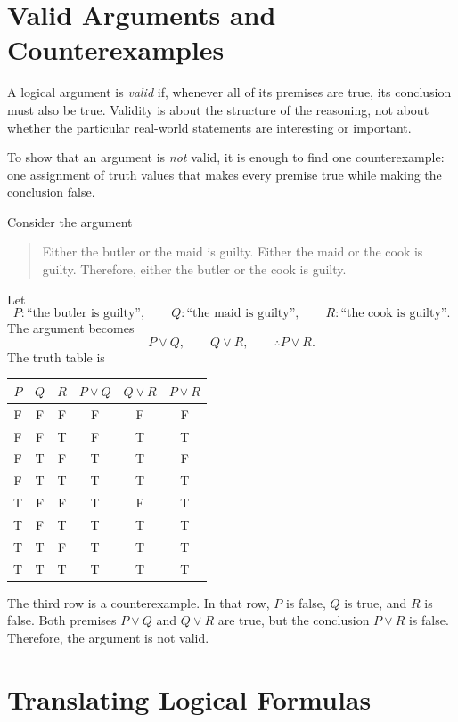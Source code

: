 \section{Valid Arguments and Counterexamples}
\label{mf:logic-argument-validity}
\label{mf:logic-counterexamples}

A logical argument is \emph{valid} if, whenever all of its premises are true, its conclusion must also be true. Validity is about the structure of the reasoning, not about whether the particular real-world statements are interesting or important.

To show that an argument is \emph{not} valid, it is enough to find one counterexample: one assignment of truth values that makes every premise true while making the conclusion false.

Consider the argument
\begin{quote}
Either the butler or the maid is guilty. Either the maid or the cook is guilty. Therefore, either the butler or the cook is guilty.
\end{quote}
Let
\[
P: \text{``the butler is guilty''},
\qquad
Q: \text{``the maid is guilty''},
\qquad
R: \text{``the cook is guilty''}.
\]
The argument becomes
\[
P \lor Q,
\qquad
Q \lor R,
\qquad
\therefore P \lor R.
\]
The truth table is
\begin{center}
\begin{tabular}{c c c c c c}
\hline
\(P\) & \(Q\) & \(R\) & \(P \lor Q\) & \(Q \lor R\) & \(P \lor R\) \\
\hline
F & F & F & F & F & F \\
F & F & T & F & T & T \\
F & T & F & T & T & F \\
F & T & T & T & T & T \\
T & F & F & T & F & T \\
T & F & T & T & T & T \\
T & T & F & T & T & T \\
T & T & T & T & T & T \\
\hline
\end{tabular}
\end{center}
The third row is a counterexample. In that row, \(P\) is false, \(Q\) is true, and \(R\) is false. Both premises \(P \lor Q\) and \(Q \lor R\) are true, but the conclusion \(P \lor R\) is false. Therefore, the argument is not valid.

\section{Translating Logical Formulas}
\label{mf:logic-translation}

